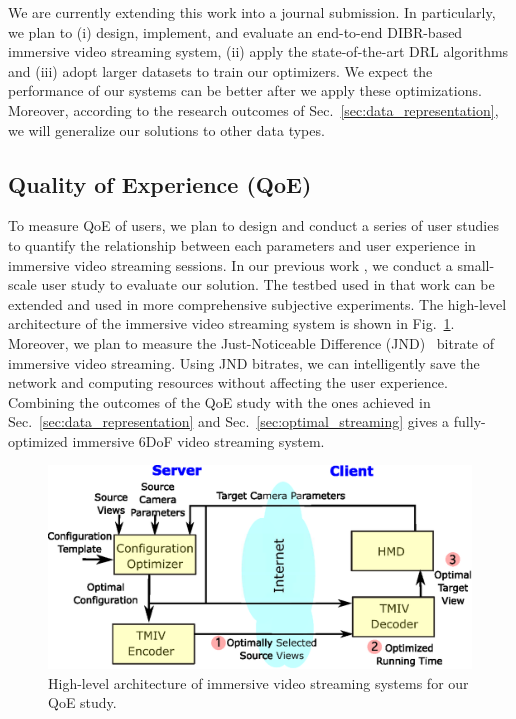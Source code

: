 We are currently extending this work into a journal submission. 
In particularly, we plan to (i) design, implement, and evaluate an end-to-end DIBR-based immersive video streaming system,
(ii) apply the state-of-the-art DRL algorithms and (iii) adopt larger datasets to train our optimizers.
We expect the performance of our systems can be better after we apply these optimizations.
Moreover, according to the research outcomes of Sec.~\ref{sec:data_representation}, 
we will generalize our solutions to other data types.
\subsection{Quality of Experience (QoE)}
To measure QoE of users, we plan to design and conduct a series of user studies  
to quantify the relationship between each parameters and user experience in immersive video streaming sessions.
In our previous work \cite{mm20_tr}, we conduct a small-scale user study to evaluate our solution.
The testbed used in that work can be extended and used in more comprehensive subjective experiments.
The high-level architecture of the immersive video streaming system is shown in Fig.~\ref{fig:architecture}.
Moreover, we plan to measure the Just-Noticeable Difference (JND)~\cite{JLK06} bitrate of immersive video streaming.
Using JND bitrates, we can intelligently save the network and computing resources without affecting the user experience.
Combining the outcomes of the QoE study with the ones achieved in Sec.~\ref{sec:data_representation} and Sec.~\ref{sec:optimal_streaming}
gives a fully-optimized immersive 6DoF video streaming system.
\begin{figure}[tbh]
	\begin{center}
		\includegraphics[width=.5\textwidth]{fig/architecture}
		\caption{High-level architecture of immersive video streaming systems for our QoE study.}
		\label{fig:architecture}
	\end{center}
\end{figure}


